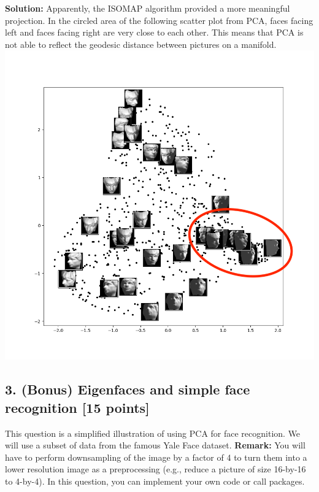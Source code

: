 \documentclass[twoside,12pt]{article}
\begin{document}
\begin{enumerate}
\begin{tcolorbox}
\textbf{Solution:} Apparently, the ISOMAP algorithm provided a more meaningful projection. In the circled area of the following scatter plot from PCA, faces facing left and faces facing right are very close to each other. This means that PCA is not able to reflect the geodesic distance between pictures on a manifold.\\
\includegraphics[width=.99\textwidth]{face_scatter_PCA.png}
\end{tcolorbox}

\end{enumerate}

\newpage

\subsection*{3. (Bonus) Eigenfaces and simple face recognition [15 points]}

This question is a simplified illustration of using PCA for face recognition. We will use a subset of data from the famous Yale Face dataset. {\bf Remark:} You will have to perform downsampling of the image by a factor of 4 to turn them into a lower resolution image as a preprocessing (e.g., reduce a picture of size 16-by-16 to 4-by-4). In this question, you can implement your own code or call packages. 
\end{document}
